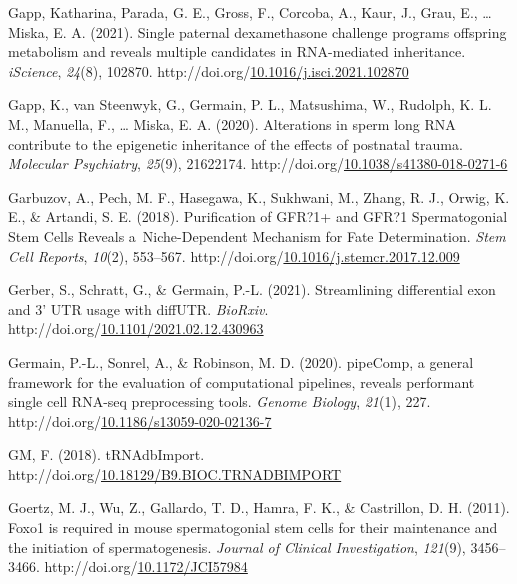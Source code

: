 \documentclass[12pt,twoside]{reedthesis}
\newlength{\cslhangindent}
\newenvironment{CSLReferences}[2] %
 {%
  \setlength{\parindent}{0pt}
  \ifodd #1 \everypar{\setlength{\hangindent}{\cslhangindent}}\ignorespaces\fi
  \ifnum #2 > 0
  \setlength{\parskip}{#2\baselineskip}
  \fi
 }%
 {}
\begin{document}
\begin{CSLReferences}{1}{0}
\leavevmode{}%
Gapp, Katharina, Parada, G. E., Gross, F., Corcoba, A., Kaur, J., Grau, E., \ldots{} Miska, E. A. (2021). Single paternal dexamethasone challenge programs offspring metabolism and reveals multiple candidates in RNA-mediated inheritance. \emph{iScience}, \emph{24}(8), 102870. http://doi.org/\href{https://doi.org/10.1016/j.isci.2021.102870}{10.1016/j.isci.2021.102870}

\leavevmode{}%
Gapp, K., van Steenwyk, G., Germain, P. L., Matsushima, W., Rudolph, K. L. M., Manuella, F., \ldots{} Miska, E. A. (2020). Alterations in sperm long RNA contribute to the epigenetic inheritance of the effects of postnatal trauma. \emph{Molecular Psychiatry}, \emph{25}(9), 21622174. http://doi.org/\href{https://doi.org/10.1038/s41380-018-0271-6}{10.1038/s41380-018-0271-6}

\leavevmode{}%
Garbuzov, A., Pech, M. F., Hasegawa, K., Sukhwani, M., Zhang, R. J., Orwig, K. E., \& Artandi, S. E. (2018). Purification of GFR?1+ and GFR?1{\textendash} Spermatogonial Stem Cells Reveals a~Niche-Dependent Mechanism for Fate Determination. \emph{Stem Cell Reports}, \emph{10}(2), 553--567. http://doi.org/\href{https://doi.org/10.1016/j.stemcr.2017.12.009}{10.1016/j.stemcr.2017.12.009}

\leavevmode{}%
Gerber, S., Schratt, G., \& Germain, P.-L. (2021). Streamlining differential exon and 3' UTR usage with diffUTR. \emph{BioRxiv}. http://doi.org/\href{https://doi.org/10.1101/2021.02.12.430963}{10.1101/2021.02.12.430963}

\leavevmode{}%
Germain, P.-L., Sonrel, A., \& Robinson, M. D. (2020). pipeComp, a general framework for the evaluation of computational pipelines, reveals performant single cell RNA-seq preprocessing tools. \emph{Genome Biology}, \emph{21}(1), 227. http://doi.org/\href{https://doi.org/10.1186/s13059-020-02136-7}{10.1186/s13059-020-02136-7}

\leavevmode{}%
GM, F. (2018). tRNAdbImport. http://doi.org/\href{https://doi.org/10.18129/B9.BIOC.TRNADBIMPORT}{10.18129/B9.BIOC.TRNADBIMPORT}

\leavevmode{}%
Goertz, M. J., Wu, Z., Gallardo, T. D., Hamra, F. K., \& Castrillon, D. H. (2011). Foxo1 is required in mouse spermatogonial stem cells for their maintenance and the initiation of spermatogenesis. \emph{Journal of Clinical Investigation}, \emph{121}(9), 3456--3466. http://doi.org/\href{https://doi.org/10.1172/JCI57984}{10.1172/JCI57984}


\end{CSLReferences}
\end{document}
